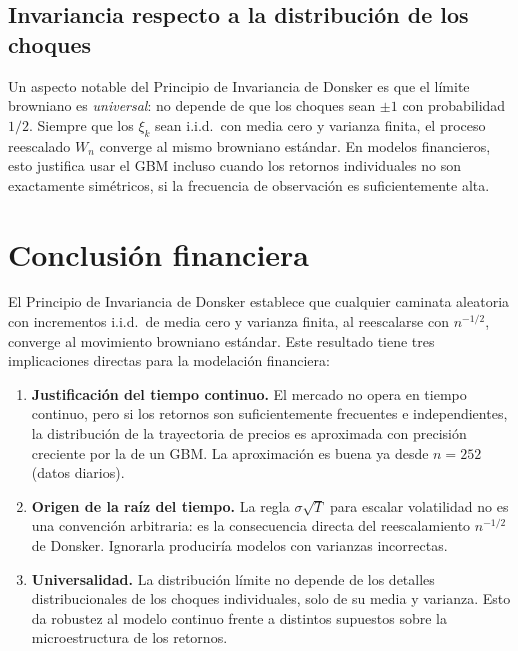 \documentclass[12pt, a4paper]{article}
\begin{document}
\subsection{Invariancia respecto a la distribución de los choques}

Un aspecto notable del Principio de Invariancia de Donsker es que el límite
browniano es \emph{universal}: no depende de que los choques sean
$\pm 1$ con probabilidad $1/2$. Siempre que los $\xi_k$ sean i.i.d.\ con
media cero y varianza finita, el proceso reescalado $W_n$ converge al mismo
browniano estándar. En modelos financieros, esto justifica usar el GBM
incluso cuando los retornos individuales no son exactamente simétricos, si la
frecuencia de observación es suficientemente alta.

\section{Conclusión financiera}

El Principio de Invariancia de Donsker establece que cualquier caminata
aleatoria con incrementos i.i.d.\ de media cero y varianza finita, al
reescalarse con $n^{-1/2}$, converge al movimiento browniano estándar. Este
resultado tiene tres implicaciones directas para la modelación financiera:

\begin{enumerate}
  \item \textbf{Justificación del tiempo continuo.} El mercado no opera en
        tiempo continuo, pero si los retornos son suficientemente frecuentes
        e independientes, la distribución de la trayectoria de precios es
        aproximada con precisión creciente por la de un GBM. La aproximación
        es buena ya desde $n = 252$ (datos diarios).

  \item \textbf{Origen de la raíz del tiempo.} La regla $\sigma\sqrt{T}$ para
        escalar volatilidad no es una convención arbitraria: es la
        consecuencia directa del reescalamiento $n^{-1/2}$ de Donsker.
        Ignorarla produciría modelos con varianzas incorrectas.

  \item \textbf{Universalidad.} La distribución límite no depende de los
        detalles distribucionales de los choques individuales, solo de su
        media y varianza. Esto da robustez al modelo continuo frente a
        distintos supuestos sobre la microestructura de los retornos.
\end{enumerate}
\end{document}

